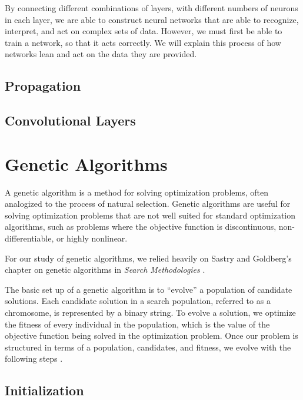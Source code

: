 \documentclass{amsart}
\begin{document}
By connecting different combinations of layers, with different numbers of
neurons in each layer, we are able to construct neural networks that are able
to recognize, interpret, and act on complex sets of data. However, we must
first be able to train a network, so that it acts correctly. We will explain
this process of how networks lean and act on the data they are provided.

\subsection{Propagation}

\subsection{Convolutional Layers}\label{sub:convolutional_layers}

\section{Genetic Algorithms} \label{section_genetic}

A genetic algorithm is a method for solving optimization problems, often
analogized to the process of natural selection. Genetic algorithms are useful
for solving optimization problems that are not well suited for standard
optimization algorithms, such as problems where the objective function is
discontinuous, non-differentiable, or highly nonlinear.

For our study of genetic algorithms, we relied heavily on Sastry and Goldberg's
chapter on genetic algorithms in \textit{Search Methodologies} \cite{genetic}.

The basic set up of a genetic algorithm is to ``evolve'' a population of
candidate solutions. Each candidate solution in a search population, referred
to as a chromosome, is represented by a binary string. To evolve a solution, we
optimize the fitness of every individual in the population, which is the value
of the objective function being solved in the optimization problem. Once our
problem is structured in terms of a population, candidates, and fitness, we
evolve with the following steps \cite{genetic}.

\subsection{Initialization}
\end{document}
